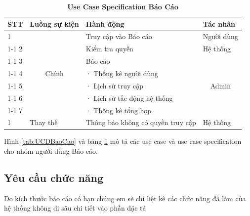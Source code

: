 \documentclass{article} %
\begin{document}
\begin{table}[H]
    \centering    
    \caption[Use Case Specification Báo Cáo]{\bfseries\fontsize{12pt}{0pt}\selectfont Use Case Specification Báo Cáo}
    \begin{tabular}{|l|c|l|c|}
        \hline
        \textbf{STT} & \multicolumn{1}{l|}{Luồng sự kiện} & Hành động                         & \multicolumn{1}{l|}{Tác nhân}   \\ \hline
        1            & \multirow{7}{*}{Chính}             & Truy cập vào Báo cáo              & \multicolumn{1}{l|}{Người dùng} \\ \cline{1-1} \cline{3-4} 
        2            &                                    & Kiểm tra quyền                    & \multicolumn{1}{l|}{Hệ thống}   \\ \cline{1-1} \cline{3-4} 
        3            &                                    & Báo cáo                           & \multirow{5}{*}{Admin}          \\ \cline{1-1} \cline{3-3}
        4            &                                    & ·      Thống kê người dùng        &                                 \\ \cline{1-1} \cline{3-3}
        5            &                                    & ·      Lịch sử truy cập           &                                 \\ \cline{1-1} \cline{3-3}
        6            &                                    & ·      Lịch sử tắc động hệ thống  &                                 \\ \cline{1-1} \cline{3-3}
        7            &                                    & ·      Thống kê tổng hợp          &                                 \\ \hline
        1            & \multicolumn{1}{l|}{Thay thế}      & Thông báo không có quyền truy cập & \multicolumn{1}{l|}{Hệ thống}   \\ \hline
        \end{tabular}
    \label{tab:UCSBaoCao}
\end{table}

Hình \ref{tab:UCDBaoCao} và bảng \ref{tab:UCSBaoCao} mô tả các use case và use case specification cho nhóm người dùng Báo cáo.
\newpage
\subsection{Yêu cầu chức năng}
Do kích thước báo cáo có hạn chúng em sẽ chỉ liệt kê các chức năng đã làm của hệ thống không đi sâu chi tiết vào phần đặc tả
\end{document}
